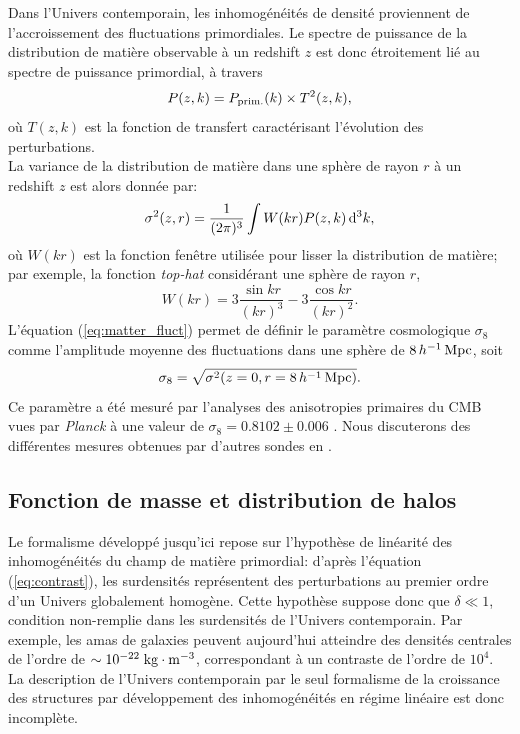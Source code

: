 Dans l'Univers contemporain, les inhomogénéités de densité proviennent de l'accroissement des fluctuations primordiales.
Le spectre de puissance de la distribution de matière observable à un redshift $z$ est donc étroitement lié au spectre de puissance primordial, à travers
\begin{equation}
    P(z, k) = P_{\rm prim.}(k) \times T^2(z, k),
\end{equation}
où $T(z, k)$ est la fonction de transfert caractérisant l'évolution des perturbations. \\
La variance de la distribution de matière dans une sphère de rayon $r$ à un redshift $z$ est alors donnée par:
\begin{equation}
    \label{eq:matter_fluct}
    \sigma^2(z, r) = \frac{1}{(2\pi)^3} \int W(kr) P(z, k) \, \mathrm{d}^3k,
\end{equation}
où $W(kr)$ est la fonction fenêtre utilisée pour lisser la distribution de matière; par exemple, la fonction \textit{top-hat} considérant une sphère de rayon $r$,
\begin{equation}
    \label{eq:tophat}
    W(kr) = 3 \frac{\sin kr}{(kr)^3} - 3 \frac{\cos kr}{(kr)^2}.
\end{equation}
L'équation (\ref{eq:matter_fluct}) permet de définir le paramètre cosmologique $\sigma_8$ comme l'amplitude moyenne des fluctuations dans une sphère de $8 \, h^{-1}\, {\rm Mpc}$, soit
\begin{equation}
    \label{eq:sigma8}
    \sigma_8 = \sqrt{\sigma^2(z=0, r=8 \, h^{-1}\, {\rm Mpc})}.
\end{equation}
Ce paramètre a été mesuré par l'analyses des anisotropies primaires du CMB vues par \textit{Planck} à une valeur de $\sigma_8 = 0.8102 \pm  0.006$ \cite{planck_collaboration_planck_2020}.
Nous discuterons des différentes mesures obtenues par d'autres sondes en .

\subsection{Fonction de masse et distribution de halos}\label{sec:cosmo_hmf}

Le formalisme développé jusqu'ici repose sur l'hypothèse de linéarité des inhomogénéités du champ de matière primordial: d'après l'équation (\ref{eq:contrast}), les surdensités représentent des perturbations au premier ordre d'un Univers globalement homogène.
Cette hypothèse suppose donc que $\delta \ll 1$, condition non-remplie dans les surdensités de l'Univers contemporain.
Par exemple, les amas de galaxies peuvent aujourd'hui atteindre des densités centrales de l'ordre de $\sim 10^{-22} \;{\rm kg \cdot m^{-3}}$, correspondant à un contraste de l'ordre de $10^4$.
La description de l'Univers contemporain par le seul formalisme de la croissance des structures par développement des inhomogénéités en régime linéaire est donc incomplète.

